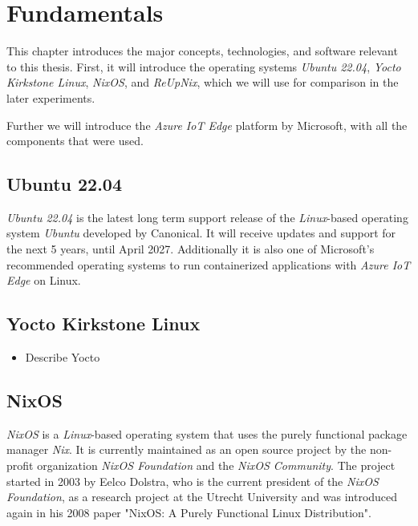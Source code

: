 \chapter{Fundamentals}
\label{sec:fundamentals}
This chapter introduces the major concepts, technologies,
and software relevant to this thesis. First, it will introduce the operating
systems \textit{Ubuntu 22.04}, \textit{Yocto Kirkstone Linux}, \textit{NixOS},
and \textit{ReUpNix}, which we will use for comparison in the later experiments.

Further we will introduce the \textit{Azure IoT Edge} platform by Microsoft,
with all the components that were used.

\section{Ubuntu 22.04}
\textit{Ubuntu 22.04} is the latest long term support release of the
\textit{Linux}-based operating system \textit{Ubuntu} developed by Canonical.
It will receive updates and support for the next 5 years, until April
2027\cite{ubuntu-releasenote}. Additionally it is also one of Microsoft's
recommended operating systems to run containerized applications with
\textit{Azure IoT Edge} on Linux\cite{msdoc-supportetplatforms}.

\section{Yocto Kirkstone Linux}
\begin{tcolorbox}[title=TODO]
    \begin{itemize}
        \item Describe Yocto
    \end{itemize}
\end{tcolorbox}

\section{NixOS}
\textit{NixOS} is a \textit{Linux}-based operating system that uses the purely
functional package manager \textit{Nix}. It is currently maintained as
an open source project by the non-profit organization \textit{NixOS Foundation}
and the \textit{NixOS Community}. The project started in 2003 by Eelco Dolstra,
who is the current president of the \textit{NixOS Foundation}, as
a research project at the Utrecht University\cite{dolstra2003} and was introduced again in his 2008
paper "NixOS: A Purely Functional Linux Distribution".


